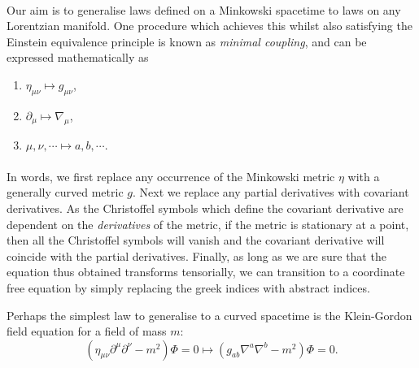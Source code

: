 \documentclass[11pt,fleqn]{report}
\begin{document}
\paragraph{}
Our aim is to generalise laws defined on a Minkowski spacetime to laws on any Lorentzian manifold.
One procedure which achieves this whilst also satisfying the Einstein equivalence principle is known as \textsl{minimal coupling}, and can be expressed mathematically as
	\begin{enumerate}
		\item $ \eta_{\mu\nu} \mapsto g_{\mu\nu} $,
		\item $ \partial_\mu \mapsto \nabla_\mu $,
		\item $ \mu, \nu, \cdots \mapsto a, b, \cdots $.
	\end{enumerate}

\paragraph{}
In words, we first replace any occurrence of the Minkowski metric $ \eta $ with a generally curved metric $ g $.
Next we replace any partial derivatives with covariant derivatives.
As the Christoffel symbols which define the covariant derivative are dependent on the \textit{derivatives} of the metric, if the metric is stationary at a point, then all the Christoffel symbols will vanish and the covariant derivative will coincide with the partial derivatives.
Finally, as long as we are sure that the equation thus obtained transforms tensorially, we can transition to a coordinate free equation by simply replacing the greek indices with abstract indices.

\begin{example}
	Perhaps the simplest law to generalise to a curved spacetime is the Klein-Gordon field equation for a field of mass $ m $:
	\begin{equation*}\label{key}
	\left( \eta_{\mu \nu} \partial^\mu \partial^\nu - m^2 \right) \Phi = 0 \mapsto \left( g_{ab} \nabla^a \nabla^b - m^2 \right) \Phi = 0.
	\end{equation*}
\end{example}
\end{document}
